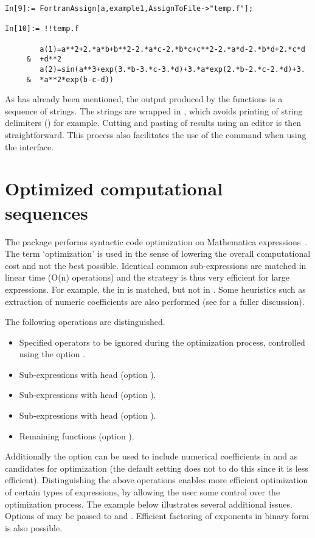 \documentclass [12pt,twoside]{article}
\begin{document}
\begin{verbatim}
In[9]:= FortranAssign[a,example1,AssignToFile->"temp.f"];

In[10]:= !!temp.f

        a(1)=a**2+2.*a*b+b**2-2.*a*c-2.*b*c+c**2-2.*a*d-2.*b*d+2.*c*d
     &  +d**2
        a(2)=sin(a**3+exp(3.*b-3.*c-3.*d)+3.*a*exp(2.*b-2.*c-2.*d)+3.
     &  *a**2*exp(b-c-d))
\end{verbatim}
As has already been mentioned, the output produced by the 
functions is a sequence of strings. The strings are wrapped in ,
which avoids printing of string delimiters (\quotes) for example. Cutting and
pasting of results using an editor is then straightforward. This process also
facilitates the use of the  command when using the
 interface.

\pagebreak[2]

\section{Optimized computational sequences}\label{form_code_opt}

The package  performs syntactic code optimization on Mathematica
expressions~\cite{me93c,me93d}. The term `optimization' is used in the sense of
lowering the overall computational cost and not the best possible. Identical
common sub-expressions are matched in linear time (O(n) operations) and the
strategy is thus very efficient for large expressions. For example, the 
in  is matched, but not in . Some heuristics
such as extraction of numeric coefficients are also performed (see \cite{me93c}
for a fuller discussion).

\noindent
The following operations are distinguished.
\begin{itemize}
\item Specified operators to be ignored during the optimization process,
controlled using the option .
\item Sub-expressions with head  (option ).
\item Sub-expressions with head  (option ).
\item Sub-expressions with head  (option ).
\item Remaining functions (option ).
\end{itemize}
Additionally the option  can be used to include numerical
coefficients in  and  as candidates for optimization (the default
setting does not to do this since it is less efficient). Distinguishing the above operations
enables more efficient optimization of certain types of expressions, by allowing the user
some control over the optimization process. The example below illustrates several additional
issues. Options of  may be passed to  and .
Efficient factoring of exponents in binary form is also possible.
\end{document}
